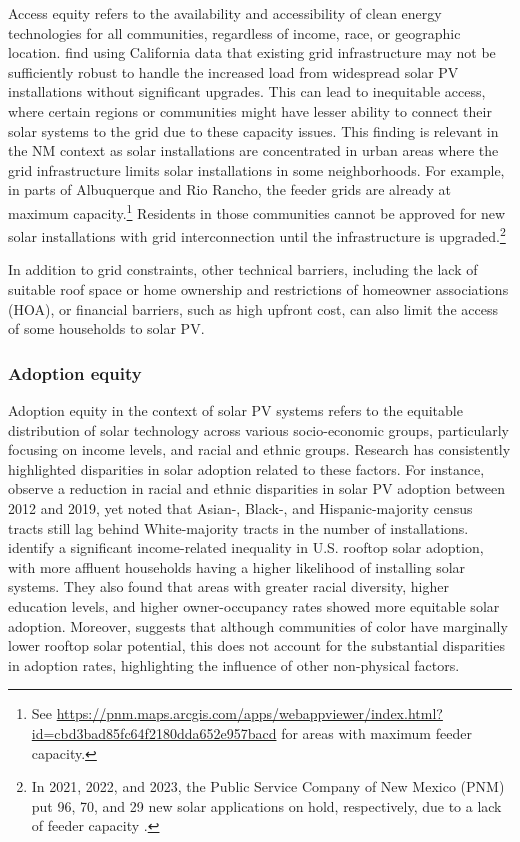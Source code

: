 \documentclass[11pt,twoside,letterpaper]{article}
\begin{document}
 Access equity refers to the availability and accessibility of clean energy technologies for all communities, regardless of income, race, or geographic location. \textcite{brockway_inequitable_2021} find using California data that existing grid infrastructure may not be sufficiently robust to handle the increased load from widespread solar PV installations without significant upgrades. This can lead to inequitable access, where certain regions or communities might have lesser ability to connect their solar systems to the grid due to these capacity issues. This finding is relevant in the NM context as solar installations are concentrated in urban areas where the grid infrastructure limits solar installations in some neighborhoods. For example, in parts of Albuquerque and Rio Rancho, the feeder grids are already at maximum capacity.\footnote{See \url{https://pnm.maps.arcgis.com/apps/webappviewer/index.html?id=cbd3bad85fc64f2180dda652e957bacd} for areas with maximum feeder capacity.} Residents in those communities cannot be approved for new solar installations with grid interconnection until the infrastructure is upgraded.\footnote{In 2021, 2022, and 2023, the Public Service Company of New Mexico (PNM) put 96, 70, and 29 new solar applications on hold, respectively, due to a lack of feeder capacity \parencite{pnm2021,pnm2022,pnm2023}. }

 In addition to grid constraints, other technical barriers, including the lack of suitable roof space or home ownership and restrictions of homeowner associations (HOA), or financial barriers, such as high upfront cost, can also limit the access of some households to solar PV.
 
 \subsubsection{Adoption equity}

Adoption equity in the context of solar PV systems refers to the equitable distribution of solar technology across various socio-economic groups, particularly focusing on income levels, and racial and ethnic groups. Research has consistently highlighted disparities in solar adoption related to these factors. For instance, \textcite{gao_solar_2022} observe a reduction in racial and ethnic disparities in solar PV adoption between 2012 and 2019, yet noted that Asian-, Black-, and Hispanic-majority census tracts still lag behind White-majority tracts in the number of installations. \textcite{darghouth_characterizing_2022} identify a significant income-related inequality in U.S. rooftop solar adoption, with more affluent households having a higher likelihood of installing solar systems. They also found that areas with greater racial diversity, higher education levels, and higher owner-occupancy rates showed more equitable solar adoption. Moreover, \textcite{reames_exploring_2021} suggests that although communities of color have marginally lower rooftop solar potential, this does not account for the substantial disparities in adoption rates, highlighting the influence of other non-physical factors.
\end{document}
